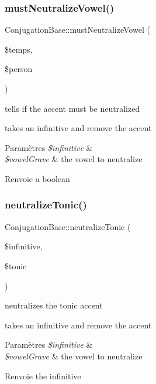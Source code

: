 \subsubsection{\texorpdfstring{must\+Neutralize\+Vowel()}{mustNeutralizeVowel()}}
{\footnotesize\ttfamily Conjugation\+Base\+::must\+Neutralize\+Vowel (\begin{DoxyParamCaption}\item[{}]{\$temps,  }\item[{}]{\$person }\end{DoxyParamCaption})\hspace{0.3cm}{\ttfamily [protected]}}



tells if the accent must be neutralized 

takes an infinitive and remove the accent


\begin{DoxyParams}{Paramètres}
{\em \$infinitive} & \\
\hline
{\em \$vowel\+Grave} & the vowel to neutralize \\
\hline
\end{DoxyParams}
\begin{DoxyReturn}{Renvoie}
a boolean 
\end{DoxyReturn}
\hypertarget{class_conjugation_base_a4fa62e858acfcf5eb83c11645687690c}{}\label{class_conjugation_base_a4fa62e858acfcf5eb83c11645687690c} 
\subsubsection{\texorpdfstring{neutralize\+Tonic()}{neutralizeTonic()}}
{\footnotesize\ttfamily Conjugation\+Base\+::neutralize\+Tonic (\begin{DoxyParamCaption}\item[{}]{\$infinitive,  }\item[{}]{\$tonic }\end{DoxyParamCaption})\hspace{0.3cm}{\ttfamily [protected]}}



neutralizes the tonic accent 

takes an infinitive and remove the accent


\begin{DoxyParams}{Paramètres}
{\em \$infinitive} & \\
\hline
{\em \$vowel\+Grave} & the vowel to neutralize \\
\hline
\end{DoxyParams}
\begin{DoxyReturn}{Renvoie}
the infinitive 
\end{DoxyReturn}
\hypertarget{class_conjugation_base_a7d66d915461d677c63117166cb85e813}{}\label{class_conjugation_base_a7d66d915461d677c63117166cb85e813} 
